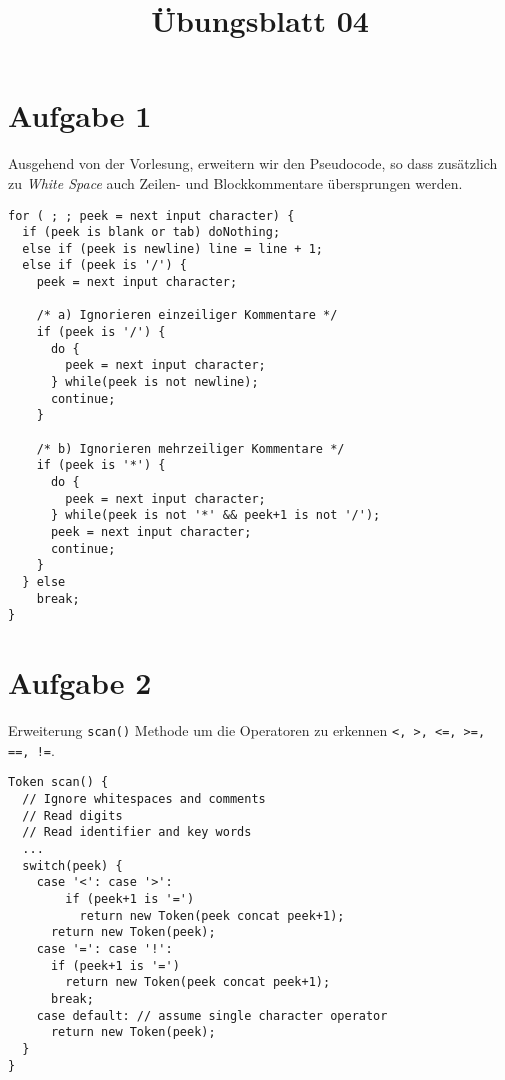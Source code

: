 \documentclass[11pt,a4paper,ngerman]{article}
\title{Übungsblatt 04}
\date{}
\newcommand\parmed{\par\medskip}
\begin{document}
 
%
%
\maketitle
\thispagestyle{fancy}


\section*{Aufgabe 1}
Ausgehend von der Vorlesung, erweitern wir den Pseudocode, so dass zusätzlich zu \emph{White Space} auch Zeilen- und Blockkommentare übersprungen werden.

\parmed
\begin{lstlisting}
for ( ; ; peek = next input character) {
  if (peek is blank or tab) doNothing;
  else if (peek is newline) line = line + 1; 
  else if (peek is '/') {
    peek = next input character;
    
    /* a) Ignorieren einzeiliger Kommentare */
    if (peek is '/') { 
      do {
      	peek = next input character;
      } while(peek is not newline);      
      continue;
    } 
    
    /* b) Ignorieren mehrzeiliger Kommentare */
    if (peek is '*') {
      do {
      	peek = next input character;
      } while(peek is not '*' && peek+1 is not '/');
      peek = next input character;
      continue;
    }    
  } else
    break;
}
\end{lstlisting}

\section*{Aufgabe 2}
Erweiterung \texttt{scan()} Methode um die Operatoren zu erkennen \texttt{<, >, <=, >=, ==, !=}.
\parmed
\begin{lstlisting}
Token scan() {
  // Ignore whitespaces and comments
  // Read digits
  // Read identifier and key words
  ...
  switch(peek) {
    case '<': case '>':
    	if (peek+1 is '=')
    	  return new Token(peek concat peek+1);
      return new Token(peek);
    case '=': case '!':
      if (peek+1 is '=')
        return new Token(peek concat peek+1);
      break;
    case default: // assume single character operator  
      return new Token(peek);
  }
}
\end{lstlisting}
\end{document}
